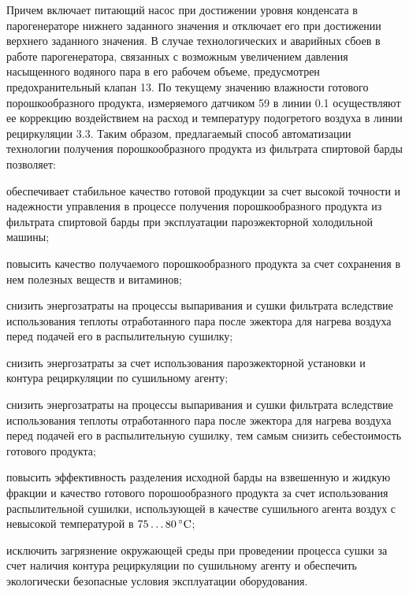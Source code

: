Причем включает питающий насос при достижении уровня конденсата в парогенераторе нижнего заданного значения и отключает его при достижении верхнего заданного значения. 
В случае технологических и аварийных сбоев в работе парогенератора, связанных с возможным увеличением давления насыщенного водяного пара в его рабочем объеме, предусмотрен предохранительный клапан 13.
По текущему значению влажности готового порошкообразного продукта, измеряемого датчиком 59 в линии 0.1 осуществляют ее коррекцию воздействием на расход и температуру подогретого воздуха в линии рециркуляции 3.3.
Таким образом, предлагаемый способ автоматизации технологии получения порошкообразного продукта из фильтрата спиртовой барды позволяет:

 
обеспечивает стабильное качество готовой продукции за счет высокой точности и надежности управления в процессе получения порошкообразного продукта из фильтрата спиртовой барды при эксплуатации пароэжекторной холодильной машины;
 
повысить качество получаемого порошкообразного продукта за счет сохранения в нем полезных веществ и витаминов;
 
снизить энергозатраты на процессы выпаривания и сушки фильтрата вследствие использования теплоты отработанного пара после эжектора для нагрева воздуха перед подачей его в распылительную сушилку;
 
снизить энергозатраты за счет использования пароэжекторной установки и контура рециркуляции по сушильному агенту;
 
снизить энергозатраты на процессы выпаривания и сушки фильтрата вследствие использования теплоты отработанного пара после эжектора для нагрева воздуха перед подачей его в распылительную сушилку, тем самым снизить себестоимость готового продукта;
 
повысить эффективность разделения исходной барды на взвешенную и жидкую фракции и качество готового порошообразного продукта за счет использования распылительной сушилки, использующей в качестве сушильного агента воздух с невысокой температурой в $75\dots80\,^{\circ}\mathrm{C}$;
 
исключить загрязнение окружающей среды при проведении процесса сушки за счет наличия контура рециркуляции по сушильному агенту и обеспечить экологически безопасные условия эксплуатации оборудования.
